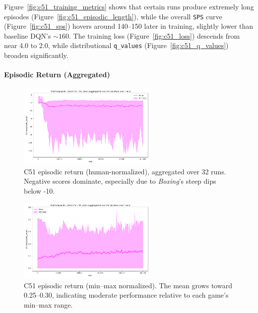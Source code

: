 Figure~\vref{fig:c51_training_metrics} shows that certain runs produce extremely long episodes 
(Figure~\ref{fig:c51_episodic_length}), 
while the overall \texttt{SPS} curve (Figure~\ref{fig:c51_sps}) hovers around 140--150 later in training, 
slightly lower than baseline DQN’s $\sim160$. 
The training loss (Figure~\ref{fig:c51_loss}) descends from near 4.0 to 2.0, 
while distributional \texttt{q\_values} (Figure~\ref{fig:c51_q_values}) broaden significantly.

\paragraph{Episodic Return (Aggregated)}

\begin{figure}
	\centering
	\includegraphics[width=0.6\textwidth]{figures/c51/charts_episodic_return_human_c51_atari.png}
	\caption{C51 episodic return (human-normalized), aggregated over 32 runs. 
		Negative scores dominate, especially due to \emph{Boxing}’s steep dips below -10.}
	\label{fig:c51_return_human}
\end{figure}

\begin{figure}
	\centering
	\includegraphics[width=0.6\textwidth]{figures/c51/charts_episodic_return_minmax_c51_atari.png}
	\caption{C51 episodic return (min--max normalized). 
		The mean grows toward 0.25--0.30, indicating moderate performance relative to each game’s min--max range.}
	\label{fig:c51_return_minmax}
\end{figure}

